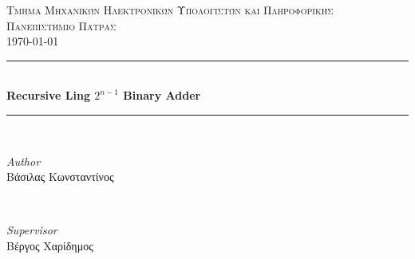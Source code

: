 
\begin{titlepage} %
	\newcommand{\HRule}{\rule{\linewidth}{0.5mm}} %
	
	\center %
	
	
	\textsc{\LARGE Τμήμα Μηχανικών Ηλεκτρονικών Υπολογιστών και Πληροφορικής}\\[1.5cm]
	\textsc{\Large Πανεπιστήμιο Πάτρας}\\[0.5cm] 
	\textsc{\large \today}\\[0.5cm]
	
	
	\HRule\\[0.4cm]
	{\huge\bfseries Recursive Ling $2^{n-1}$ Binary Adder}\\[0.4cm] %
	\HRule\\[1.5cm]
	
	
	\begin{minipage}{0.4\textwidth}
		\begin{flushleft}
			\large
			\textit{Author}\\
			Βάσιλας Κωνσταντίνος %
		\end{flushleft}
	\end{minipage}
	~
	\begin{minipage}{0.4\textwidth}
		\begin{flushright}
			\large
			\textit{Supervisor}\\
			Βέργος Χαρίδημος  %
		\end{flushright}
	\end{minipage}

	 
	
	
\end{titlepage}




